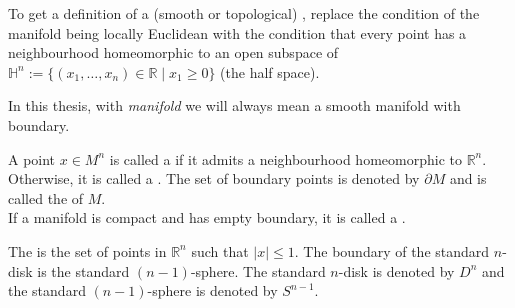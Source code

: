 \documentclass[a4paper,11pt]{article}
\begin{document}
\begin{definition}
    To get a definition of a (smooth or topological) , replace the condition of the manifold being locally Euclidean with the condition that every point has a neighbourhood homeomorphic to an open subspace of \(\mathbb{H}^n:=\{(x_1,\dots,x_n)\in\mathbb{R}\mid x_1\geq0\}\) (the half space).
\end{definition}

\begin{comment}
\begin{definition}[Manifold]
    A \demph{smooth manifold with boundary} \(M=(M,[\mathcal{A}])\) is the data of a topological space \(M\) and an equivalence class \([\mathcal{A}]\) of smooth atlases such that:
    \begin{itemize}
        \item \(M\) is Hausdorff,
        \item \(M\) is second countable,
        \item \(\mathcal{A}\) is locally finite.
    \end{itemize}
\end{definition}
\end{comment}

\begin{remark}
    In this thesis, with \emph{manifold} we will always mean a smooth manifold with boundary.
\end{remark}

\begin{definition}
    A point \(x\in M^n\) is called a  if it admits a neighbourhood homeomorphic to \(\mathbb{R}^n\). Otherwise, it is called a . The set of boundary points is denoted by \(\partial M\) and is called the  of \(M\).\\
    If a manifold is compact and has empty boundary, it is called a . %
\end{definition}

\begin{example}
    The  is the set of points in \(\mathbb{R}^n\) such that \(|{x}|\leq1\). 
    The boundary of the standard \(n\)-disk is the standard \((n-1)\)-sphere.
    The standard \(n\)-disk is denoted by \(D^n\) and the standard \((n-1)\)-sphere is denoted by \(S^{n-1}\).
\end{example}
\end{document}
